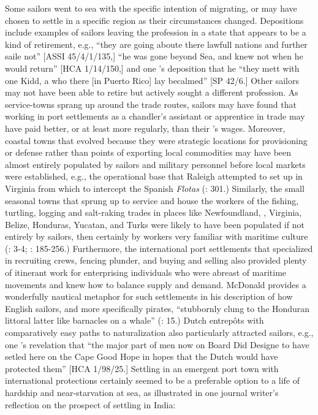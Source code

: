 Some sailors went to sea with the specific intention of migrating, or may have chosen to settle in a specific region as their circumstances changed.  Depositions include examples of sailors leaving the profession in a state that appears to be a kind of retirement, e.g., “they are going aboute there lawfull nations and further saile not” [ASSI 45/4/1/135,] “he was gone beyond Sea, and knew not when he would return” [HCA 1/14/150,] and one ’s deposition that he “they mett with one Kidd, a  who there [in Puerto Rico] lay becalmed” [SP 42/6.] Other sailors may not have been able to retire but actively sought a different profession. As service-towns sprang up around the trade routes, sailors may have found that working in port settlements as a chandler’s assistant or apprentice in trade may have paid better, or at least more regularly, than their ’s wages. Moreover, coastal towns that evolved because they were strategic locations for provisioning or defense rather than points of exporting local commodities may have been almost entirely populated by sailors and military personnel before local markets were established, e.g., the operational base that Raleigh attempted to set up in Virginia from which to intercept the Spanish \textit{Flotas} (\citealt{Bicheno2012}: 301.) Similarly, the small seasonal towns that sprung up to service and house the workers of the fishing, turtling, logging and salt-raking trades in places like Newfoundland, , Virginia, Belize, Honduras, Yucatan, and Turks were likely to have been populated if not entirely by sailors, then certainly by workers very familiar with maritime culture (\citealt{Draper2016}: 3-4; \citealt{Jarvis2010}: 185-256.) Furthermore, the international port settlements that specialized in recruiting crews, fencing plunder, and buying and selling  also provided plenty of itinerant work for enterprising individuals who were abreast of maritime movements and knew how to balance supply and demand. McDonald provides a wonderfully nautical metaphor for such settlements in his description of how English sailors, and more specifically pirates, “stubbornly clung to the Honduran littoral latter like barnacles on a whale” (\citealt{McDonald2016}: 15.) Dutch entrepôts with comparatively easy paths to naturalization also particularly attracted sailors, e.g., one ’s revelation that “the major part of men now on Board Did Designe to have setled here on the Cape Good Hope in hopes that the Dutch would have protected them” [HCA 1/98/25.] Settling in an emergent port town with international protections certainly seemed to be a preferable option to a life of hardship and near-starvation at sea, as illustrated in one journal writer’s reflection on the prospect of settling in India:

